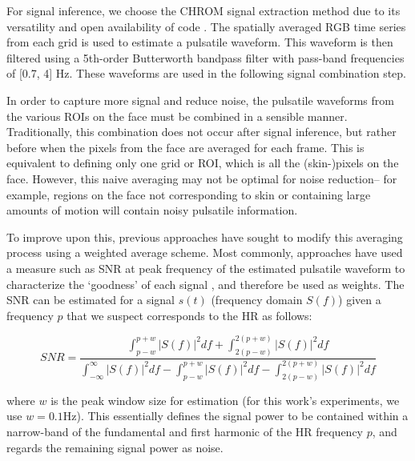 For signal inference, we choose the CHROM \cite{haan_robust_2013} signal extraction method due to its versatility and open availability of code \cite{mcduff_iphys_2019}. The spatially averaged RGB time series from each grid is used to estimate a pulsatile waveform. This waveform is then filtered using a 5th-order Butterworth bandpass filter with pass-band frequencies of [0.7, 4] Hz. These waveforms are used in the following signal combination step. 

In order to capture more signal and reduce noise, the pulsatile waveforms from the various ROIs on the face must be combined in a sensible manner. Traditionally, this combination does not occur after signal inference, but rather before when the pixels from the face are averaged for each frame. This is equivalent to defining only one grid or ROI, which is all the (skin-)pixels on the face. However, this naive averaging may not be optimal for noise reduction-- for example, regions on the face not corresponding to skin or containing large amounts of motion will contain noisy pulsatile information. 

To improve upon this, previous approaches have sought to modify this averaging process using a weighted average scheme. Most commonly, approaches have used a measure such as SNR at peak frequency of the estimated pulsatile waveform to characterize the `goodness' of each signal \cite{haan_robust_2013,po_block-based_2018,li_model-based_2020,kumar_distanceppg_2015,bobbia_unsupervised_2019}, and therefore be used as weights. The SNR can be estimated for a signal $s(t)$ (frequency domain $S(f)$) given a frequency $p$ that we suspect corresponds to the HR as follows:

\begin{equation}
    SNR=\frac{\int_{p-w}^{p+w}{\left|S(f)\right|^2df}+\int_{2(p-w)}^{2(p+w)}{\left|S(f)\right|^2df}}{\int_{-\infty}^{\infty}{\left|S(f)\right|^2df}-\int_{p-w}^{p+w}{\left|S(f)\right|^2df}-\int_{2(p-w)}^{2(p+w)}{\left|S(f)\right|^2df}}
\end{equation}

where $w$ is the peak window size for estimation (for this work’s experiments, we use $w=0.1$Hz). This essentially defines the signal power to be contained within a narrow-band of the fundamental and first harmonic of the HR frequency $p$, and regards the remaining signal power as noise.  

